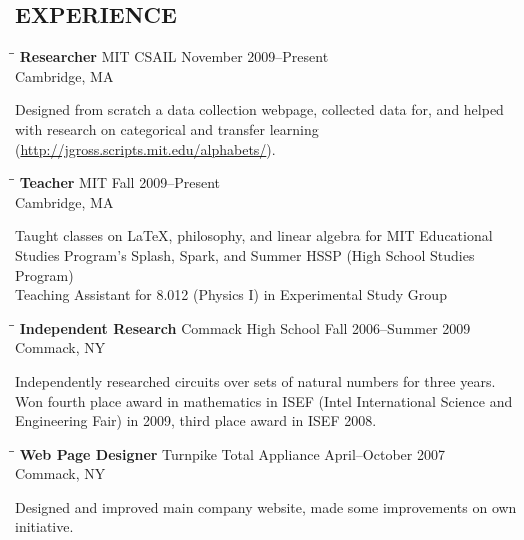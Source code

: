 \documentclass{res}
\begin{document}
\begin{resume}
\section{EXPERIENCE}
   \vspace{-0.1in}	
   \begin{tabbing}
   \hspace{2.3in}\= \hspace{2.6in}\= \kill %
    {\bf Researcher} \>MIT CSAIL     \>November 2009--Present\\
                             \>Cambridge, MA
   \end{tabbing}\vspace{-20pt}      %
    Designed from scratch a data collection webpage, collected data for, and helped with research on categorical and transfer learning (\url{http://jgross.scripts.mit.edu/alphabets/}).
   \begin{tabbing}
   \hspace{2.3in}\= \hspace{2.6in}\= \kill %
    {\bf Teacher} \>MIT     \>Fall 2009--Present\\
                             \>Cambridge, MA
   \end{tabbing}\vspace{-20pt}      %
    Taught classes on \LaTeX, philosophy, and linear algebra for MIT Educational Studies Program's Splash, Spark, and Summer HSSP (High School Studies Program) \\
    Teaching Assistant for 8.012 (Physics I) in Experimental Study Group
   \begin{tabbing}
   \hspace{2.3in}\= \hspace{2.6in}\= \kill %
    {\bf Independent Research} \>Commack High School     \>Fall 2006--Summer 2009\\
                             \>Commack, NY
   \end{tabbing}\vspace{-20pt}      %
    Independently researched circuits over sets of natural numbers for three years. \\
    Won fourth place award in mathematics in ISEF (Intel International Science and Engineering Fair) in 2009, third place award in ISEF 2008.
    
   \begin{tabbing}
   \hspace{2.3in}\= \hspace{2.6in}\= \kill %
    {\bf Web Page Designer} \>Turnpike Total Appliance     \>April--October 2007\\
                             \>Commack, NY
   \end{tabbing}\vspace{-20pt}      %
    Designed and improved main company website, made some improvements on own initiative.
          



\end{resume}
\end{document}
